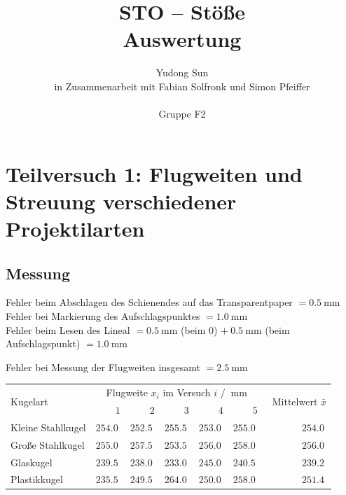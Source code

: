 \documentclass[twoside]{article}
\title{STO -- Stöße \\ Auswertung}
\author{Yudong Sun \\{\small in Zusammenarbeit mit Fabian Solfronk und Simon Pfeiffer}\\\\ Gruppe F2}
\makeatletter
\newcommand{\nonum}[0]{%
        \let\@oldseccntformat\@seccntformat %
        \renewcommand\@seccntformat[1]{}%
        }
\newcommand{\ra}[1]{\renewcommand{\arraystretch}{#1}}
\makeatother
\begin{document}
\maketitle

\nonum
{}

\section{Teilversuch 1: Flugweiten und Streuung verschiedener Projektilarten}
    \subsection{Messung}
        Fehler beim Abschlagen des Schienendes auf das Transparentpaper $= \SI{0.5}{\milli\meter}$\\
        Fehler bei Markierung des Aufschlagspunktes $= \SI{1.0}{\milli\meter}$ \\
        Fehler beim Lesen des Lineal $= \SI{0.5}{\milli\meter}$ (beim 0) $+ ~\SI{0.5}{\milli\meter}$ (beim Aufschlagspunkt) $ = \SI{1,0}{\milli\meter}$

        Fehler bei Messung der Flugweiten insgesamt $= \SI{2.5}{\milli\meter}$

        \vspace{\baselineskip}
        \begin{center}
            \ra{1.2}
            \begin{tabular}{l rrrrr r}
                \toprule
                \multirow{2}{*}{Kugelart} & \multicolumn{5}{c}{Flugweite $x_i$ im Versuch $i$ / $\SI{}{\milli\meter}$} & \multirow{2}{*}{~Mittelwert $\bar{x}$} \\
                \cmidrule{2-6} & $1$ & $2$ & $3$ & $4$ & $5$ &  \\
                \midrule
                Kleine Stahlkugel & $\SI{254.0}{}$ & $\SI{252.5}{}$ & $\SI{255.5}{}$ & $\SI{253.0}{}$ & $\SI{255.0}{}$ & $\SI{254.0}{}$\\
                Große Stahlkugel  & $\SI{255.0}{}$ & $\SI{257.5}{}$ & $\SI{253.5}{}$ & $\SI{256.0}{}$ & $\SI{258.0}{}$ & $\SI{256.0}{}$\\
                Glaskugel         & $\SI{239.5}{}$ & $\SI{238.0}{}$ & $\SI{233.0}{}$ & $\SI{245.0}{}$ & $\SI{240.5}{}$ & $\SI{239.2}{}$\\
                Plastikkugel      & $\SI{235.5}{}$ & $\SI{249.5}{}$ & $\SI{264.0}{}$ & $\SI{250.0}{}$ & $\SI{258.0}{}$ & $\SI{251.4}{}$\\
                \bottomrule
            \end{tabular}
        \end{center}
        \vspace{\baselineskip}
\end{document}
